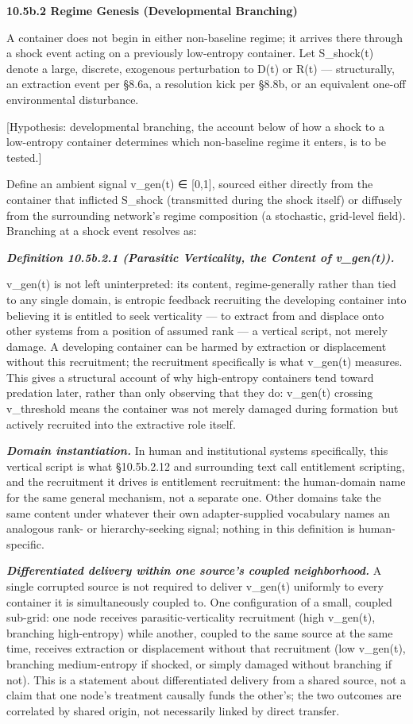 \documentclass[
]{article}
\begin{document}
\textbf{10.5b.2 Regime Genesis (Developmental Branching)}

A container does not begin in either non-baseline regime; it arrives
there through a shock event acting on a previously low-entropy
container. Let S\_shock(t) denote a large, discrete, exogenous
perturbation to D(t) or R(t) --- structurally, an extraction event per
§8.6a, a resolution kick per §8.8b, or an equivalent one-off
environmental disturbance.

{[}Hypothesis: developmental branching, the account below of how a shock
to a low-entropy container determines which non-baseline regime it
enters, is to be tested.{]}

Define an ambient signal v\_gen(t) ∈ {[}0,1{]}, sourced either directly
from the container that inflicted S\_shock (transmitted during the shock
itself) or diffusely from the surrounding network's regime composition
(a stochastic, grid-level field). Branching at a shock event resolves
as:

\emph{\textbf{Definition 10.5b.2.1 (Parasitic Verticality, the Content
of v\_gen(t)).}}

v\_gen(t) is not left uninterpreted: its content, regime-generally
rather than tied to any single domain, is entropic feedback recruiting
the developing container into believing it is entitled to seek
verticality --- to extract from and displace onto other systems from a
position of assumed rank --- a vertical script, not merely damage. A
developing container can be harmed by extraction or displacement without
this recruitment; the recruitment specifically is what v\_gen(t)
measures. This gives a structural account of why high-entropy containers
tend toward predation later, rather than only observing that they do:
v\_gen(t) crossing v\_threshold means the container was not merely
damaged during formation but actively recruited into the extractive role
itself.

\emph{\textbf{Domain instantiation.}} In human and institutional systems
specifically, this vertical script is what §10.5b.2.12 and surrounding
text call entitlement scripting, and the recruitment it drives is
entitlement recruitment: the human-domain name for the same general
mechanism, not a separate one. Other domains take the same content under
whatever their own adapter-supplied vocabulary names an analogous rank-
or hierarchy-seeking signal; nothing in this definition is
human-specific.

\emph{\textbf{Differentiated delivery within one source's coupled
neighborhood.}} A single corrupted source is not required to deliver
v\_gen(t) uniformly to every container it is simultaneously coupled to.
One configuration of a small, coupled sub-grid: one node receives
parasitic-verticality recruitment (high v\_gen(t), branching
high-entropy) while another, coupled to the same source at the same
time, receives extraction or displacement without that recruitment (low
v\_gen(t), branching medium-entropy if shocked, or simply damaged
without branching if not). This is a statement about differentiated
delivery from a shared source, not a claim that one node's treatment
causally funds the other's; the two outcomes are correlated by shared
origin, not necessarily linked by direct transfer.
\end{document}
